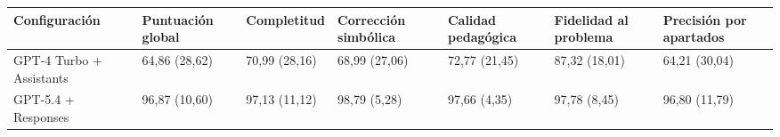 \begin{tabular}{lllllll}
\toprule
Configuración & Puntuación global & Completitud & Corrección simbólica & Calidad pedagógica & Fidelidad al problema & Precisión por apartados \\
\midrule
GPT-4 Turbo + Assistants & 64,86 (28,62) & 70,99 (28,16) & 68,99 (27,06) & 72,77 (21,45) & 87,32 (18,01) & 64,21 (30,04) \\
GPT-5.4 + Responses & 96,87 (10,60) & 97,13 (11,12) & 98,79 (5,28) & 97,66 (4,35) & 97,78 (8,45) & 96,80 (11,79) \\
\bottomrule
\end{tabular}
